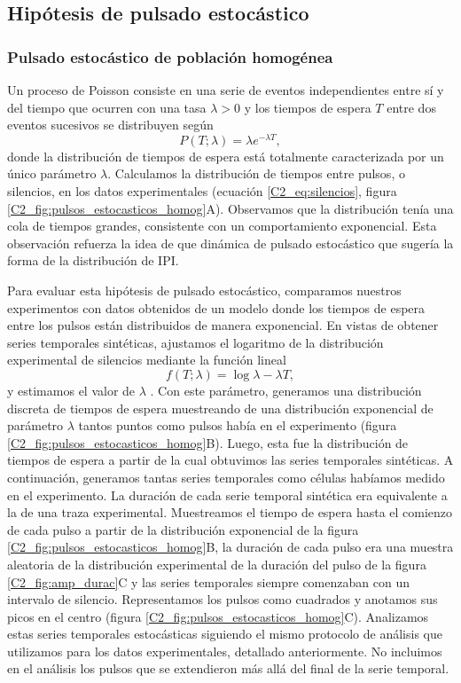 \documentclass[./main.tex]{subfiles}
\begin{document}
\subsection{Hipótesis de pulsado estocástico}
\subsubsection*{Pulsado estocástico de población homogénea}

Un proceso de Poisson consiste en una serie de eventos independientes entre sí y del tiempo que ocurren con una tasa $\lambda > 0$ y los tiempos de espera $T$ entre dos eventos sucesivos se distribuyen según \cite{TimeSeries1972,Levine2013}
\begin{equation}
    P(T;\lambda) = \lambda e^{-\lambda T},
\end{equation}
donde la distribución de tiempos de espera está totalmente caracterizada por un único parámetro $\lambda$. Calculamos la distribución de tiempos entre pulsos, o silencios, en los datos experimentales (ecuación \ref{C2_eq:silencios}, figura \ref{C2_fig:pulsos_estocasticos_homog}A). Observamos que la distribución tenía una cola de tiempos grandes, consistente con un comportamiento exponencial. Esta observación refuerza la idea de que dinámica de pulsado estocástico que sugería la forma de la distribución de IPI. 

Para evaluar esta hipótesis de pulsado estocástico, comparamos nuestros experimentos con datos obtenidos de un modelo donde los tiempos de espera entre los pulsos están distribuidos de manera exponencial. En vistas de obtener series temporales sintéticas, ajustamos el logaritmo de la distribución experimental de silencios mediante la función lineal 
\begin{equation}
    f(T;\lambda) = \log{\lambda} - \lambda T,
    \label{C2_eq:ajuste_homogeneo}
\end{equation}
y estimamos el valor de $\lambda$ \cite{Harris2020}. Con este parámetro, generamos una distribución discreta de tiempos de espera muestreando de una distribución exponencial de parámetro $\lambda$ tantos puntos como pulsos había en el experimento (figura \ref{C2_fig:pulsos_estocasticos_homog}B). Luego, esta fue la distribución de tiempos de espera a partir de la cual obtuvimos las series temporales sintéticas. A continuación, generamos tantas series temporales como células habíamos medido en el experimento. La duración de cada serie temporal sintética era equivalente a la de una traza experimental. Muestreamos el tiempo de espera hasta el comienzo de cada pulso a partir de la distribución exponencial de la figura \ref{C2_fig:pulsos_estocasticos_homog}B, la duración de cada pulso era una muestra aleatoria de la distribución experimental de la duración del pulso de la figura \ref{C2_fig:amp_durac}C y las series temporales siempre comenzaban con un intervalo de silencio. Representamos los pulsos como cuadrados y anotamos sus picos en el centro (figura \ref{C2_fig:pulsos_estocasticos_homog}C). Analizamos estas series temporales estocásticas siguiendo el mismo protocolo de análisis que utilizamos para los datos experimentales, detallado anteriormente. No incluimos en el análisis los pulsos que se extendieron más allá del final de la serie temporal. 
\end{document}
